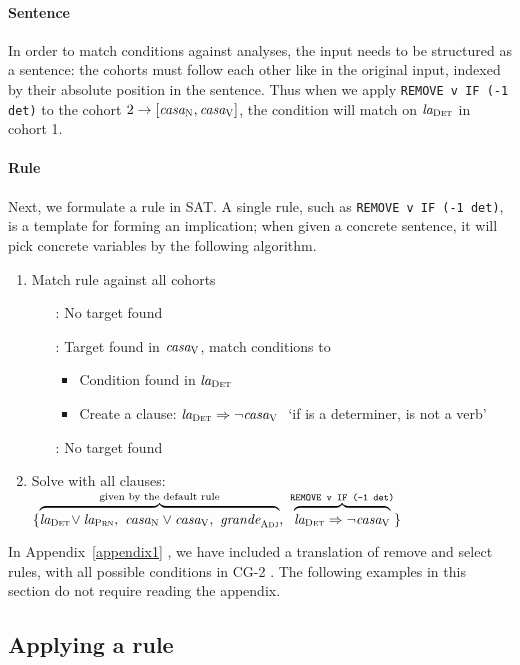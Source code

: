 \paragraph{Sentence}
In order to match conditions against analyses, the input needs to be structured as a sentence: the cohorts must follow each other like in the original input, indexed by their absolute position in the sentence. Thus when we apply \texttt{REMOVE v IF (-1 det)} to the cohort $2 \rightarrow [\text{\em casa}_{\text{\sc N}} , \text{\em casa}_{\text{\sc V}}]$, the condition will match on $\text{\em la}_{\text{\sc Det}}$ in cohort 1.


\paragraph{Rule}

Next, we formulate a rule in SAT. A single rule, such as \texttt{REMOVE v IF (-1 det)}, is a template for forming an implication; when given a concrete sentence, it will pick concrete variables by the following algorithm.

\begin{enumerate}
\item Match rule against all cohorts
 \begin{itemize}
    \item[\la:] No target found
    \item[\casa:] Target found in $\text{\em casa}_{\text{\sc V}}$, match conditions to \la
      \begin{itemize}
       \item Condition found in $\text{\em la}_{\text{\sc Det}}$
       \item Create a clause: $\text{\em la}_{\text{\sc Det}} \Rightarrow \neg \text{\em casa}_{\text{\sc V}} \ $ `if \la{} is a determiner, \casa{} is not a verb'
      \end{itemize}
    \item[\grande:] No target found
  \end{itemize}
\item Solve with all clauses: 
  $\{ \ob{\laDet \! \vee \laPrn, \ \casaN \vee \casaV, \  \grandeAdj}^{\text{given by the default rule}}, \ 
      \ob{\laDet \Rightarrow \neg \casaV}^{\t{REMOVE v IF (-1 det)}} \}$
\end{enumerate}

In Appendix~\ref{appendix1}
, we have included a translation of {\sc remove} and {\sc select} rules, with all possible conditions in CG-2 . The following examples in this section do not require reading the appendix.

\subsection{Applying a rule}

